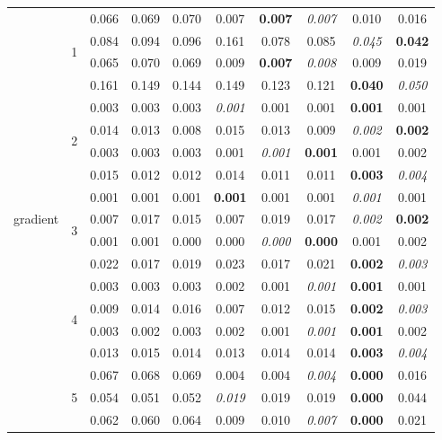 \documentclass[authoryear, review, 11pt]{elsarticle}
\begin{document}
\begin{table}
\begin{center}
{\begin{tabular}{cccccccccc}
		  \hline
		  \multirow{20}{*}{gradient} & \multirow{4}{*}{1} & 0.066 & 0.069 & 0.070 & 0.007 & \textbf{0.007} & \emph{0.007} & 0.010 & 0.016 \\ 
		  &  & 0.084 & 0.094 & 0.096 & 0.161 & 0.078 & 0.085 & \emph{0.045} & \textbf{0.042} \\ 
		  &  & 0.065 & 0.070 & 0.069 & 0.009 & \textbf{0.007} & \emph{0.008} & 0.009 & 0.019 \\ 
		  &  & 0.161 & 0.149 & 0.144 & 0.149 & 0.123 & 0.121 & \textbf{0.040} & \emph{0.050} \\ 
		  \cline{3-10}
		  & \multirow{4}{*}{2} & 0.003 & 0.003 & 0.003 & \emph{0.001} & 0.001 & 0.001 & \textbf{0.001} & 0.001 \\ 
		  &  & 0.014 & 0.013 & 0.008 & 0.015 & 0.013 & 0.009 & \emph{0.002} & \textbf{0.002} \\ 
		  &  & 0.003 & 0.003 & 0.003 & 0.001 & \emph{0.001} & \textbf{0.001} & 0.001 & 0.002 \\ 
		  &  & 0.015 & 0.012 & 0.012 & 0.014 & 0.011 & 0.011 & \textbf{0.003} & \emph{0.004} \\ 
		  \cline{3-10}
		  & \multirow{4}{*}{3} & 0.001 & 0.001 & 0.001 & \textbf{0.001} & 0.001 & 0.001 & \emph{0.001} & 0.001 \\ 
		  &  & 0.007 & 0.017 & 0.015 & 0.007 & 0.019 & 0.017 & \emph{0.002} & \textbf{0.002} \\ 
		  &  & 0.001 & 0.001 & 0.000 & 0.000 & \emph{0.000} & \textbf{0.000} & 0.001 & 0.002 \\ 
		  &  & 0.022 & 0.017 & 0.019 & 0.023 & 0.017 & 0.021 & \textbf{0.002} & \emph{0.003} \\ 
		  \cline{3-10}
		  & \multirow{4}{*}{4} & 0.003 & 0.003 & 0.003 & 0.002 & 0.001 & \emph{0.001} & \textbf{0.001} & 0.001 \\ 
		  &  & 0.009 & 0.014 & 0.016 & 0.007 & 0.012 & 0.015 & \textbf{0.002} & \emph{0.003} \\ 
		  &  & 0.003 & 0.002 & 0.003 & 0.002 & 0.001 & \emph{0.001} & \textbf{0.001} & 0.002 \\ 
		  &  & 0.013 & 0.015 & 0.014 & 0.013 & 0.014 & 0.014 & \textbf{0.003} & \emph{0.004} \\ 
		  \cline{3-10}
		  & \multirow{4}{*}{5} & 0.067 & 0.068 & 0.069 & 0.004 & 0.004 & \emph{0.004} & \textbf{0.000} & 0.016 \\ 
		  &  & 0.054 & 0.051 & 0.052 & \emph{0.019} & 0.019 & 0.019 & \textbf{0.000} & 0.044 \\ 
		  &  & 0.062 & 0.060 & 0.064 & 0.009 & 0.010 & \emph{0.007} & \textbf{0.000} & 0.021 \\ 

\end{tabular}}
\end{center}
\end{table}
\end{document}
